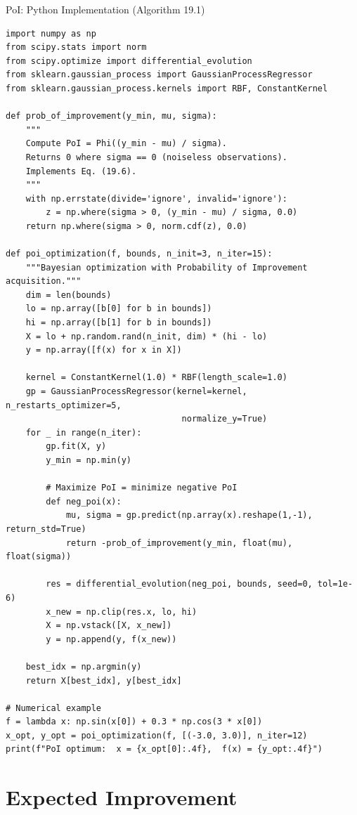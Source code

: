 \documentclass[aspectratio=169,10pt]{beamer}
\begin{document}
\begin{frame}[fragile]{PoI: Python Implementation (Algorithm 19.1)}
\begin{lstlisting}[caption={Probability of Improvement acquisition function (Algorithm 19.1 equivalent)}]
import numpy as np
from scipy.stats import norm
from scipy.optimize import differential_evolution
from sklearn.gaussian_process import GaussianProcessRegressor
from sklearn.gaussian_process.kernels import RBF, ConstantKernel

def prob_of_improvement(y_min, mu, sigma):
    """
    Compute PoI = Phi((y_min - mu) / sigma).
    Returns 0 where sigma == 0 (noiseless observations).
    Implements Eq. (19.6).
    """
    with np.errstate(divide='ignore', invalid='ignore'):
        z = np.where(sigma > 0, (y_min - mu) / sigma, 0.0)
    return np.where(sigma > 0, norm.cdf(z), 0.0)

def poi_optimization(f, bounds, n_init=3, n_iter=15):
    """Bayesian optimization with Probability of Improvement acquisition."""
    dim = len(bounds)
    lo = np.array([b[0] for b in bounds])
    hi = np.array([b[1] for b in bounds])
    X = lo + np.random.rand(n_init, dim) * (hi - lo)
    y = np.array([f(x) for x in X])

    kernel = ConstantKernel(1.0) * RBF(length_scale=1.0)
    gp = GaussianProcessRegressor(kernel=kernel, n_restarts_optimizer=5,
                                   normalize_y=True)
    for _ in range(n_iter):
        gp.fit(X, y)
        y_min = np.min(y)

        # Maximize PoI = minimize negative PoI
        def neg_poi(x):
            mu, sigma = gp.predict(np.array(x).reshape(1,-1), return_std=True)
            return -prob_of_improvement(y_min, float(mu), float(sigma))

        res = differential_evolution(neg_poi, bounds, seed=0, tol=1e-6)
        x_new = np.clip(res.x, lo, hi)
        X = np.vstack([X, x_new])
        y = np.append(y, f(x_new))

    best_idx = np.argmin(y)
    return X[best_idx], y[best_idx]

# Numerical example
f = lambda x: np.sin(x[0]) + 0.3 * np.cos(3 * x[0])
x_opt, y_opt = poi_optimization(f, [(-3.0, 3.0)], n_iter=12)
print(f"PoI optimum:  x = {x_opt[0]:.4f},  f(x) = {y_opt:.4f}")
\end{lstlisting}
\end{frame}

\section{Expected Improvement}
\end{document}
